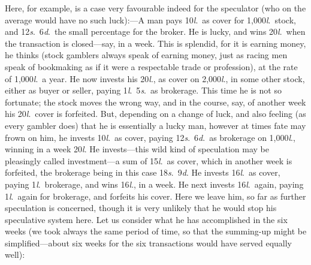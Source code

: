 \documentclass[letterpaper,12pt,oneside,openany]{memoir}
\begin{document}
Here, for example, is a case very favourable indeed
for the speculator (who on the average would have no
such luck):---A man pays 10\textit{l}.\ as cover for 1,000\textit{l}.\ stock,
and 12\textit{s}.\ 6\textit{d}.\ the small percentage for the broker.
He is lucky, and wins 20\textit{l}.\ when the transaction is
closed---say, in a week. This is splendid, for it is earning
money, he thinks (stock gamblers always speak of
earning money, just as racing men speak of bookmaking
as if it were a respectable trade or profession), at
the rate of 1,000\textit{l}.\ a year. He now invests his 20\textit{l}., as
cover on 2,000\textit{l}., in some other stock, either as buyer or
seller, paying 1\textit{l}.\ 5\textit{s}.\ as brokerage. This time he is not
so fortunate; the stock moves the wrong way, and in
the course, say, of another week his 20\textit{l}.\ cover is forfeited.
But, depending on a change of luck, and also
feeling (as every gambler does) that he is essentially a
lucky man, however at times fate may frown on him,
he invests 10\textit{l}.\ as cover, paying 12\textit{s}.\ 6\textit{d}.\ as brokerage
on 1,000\textit{l}., winning in a week 20\textit{l}. He invests---this
wild kind of speculation may be pleasingly called investment---a
sum of 15\textit{l}.\ as cover, which in another week is
forfeited, the brokerage being in this case 18\textit{s}.\ 9\textit{d}. He
invests 16\textit{l}.\ as cover, paying 1\textit{l}.\ brokerage, and wins
16\textit{l}., in a week. He next invests 16\textit{l}.\ again, paying 1\textit{l}.\ again
for brokerage, and forfeits his cover. Here we
leave him, so far as further speculation is concerned,
though it is very unlikely that he would stop his speculative
system here. Let us consider what he has accomplished
in the six weeks (we took always the same
period of time, so that the summing-up might be simplified---about
six weeks for the six transactions would
have served equally well):
\end{document}
